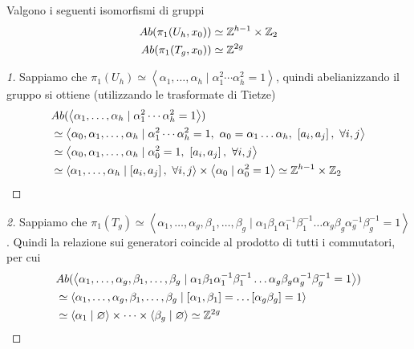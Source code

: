 \begin{lemma}
	\label{lemm:abel_torus_proj}
	Valgono i seguenti isomorfismi di gruppi
	\begin{equation}
	\begin{aligned}
	 Ab(\pi_1(U_h, x_0)) & \simeq \mathbb{Z}^{h-1} \times \mathbb{Z}_2 \\
	 Ab(\pi_1(T_g, x_0)) & \simeq \mathbb{Z}^{2g}
	\end{aligned}
	\end{equation}  
\end{lemma}
\begin{proof}[1]
	Sappiamo che $\pi_1(U_h) \simeq \left\langle \alpha_1, \dots, \alpha_h \mid \alpha^2_1 \cdots \alpha^2_h = 1\right\rangle$, quindi abelianizzando il gruppo si ottiene (utilizzando le trasformate di Tietze)
	\begin{equation}
	\begin{aligned}
		& Ab( \left\langle \alpha_1, \dots, \alpha_h \mid \alpha^2_1 \cdots \alpha^2_h = 1\right\rangle) \\
		& \simeq \left\langle \alpha_0, \alpha_1, \dots, \alpha_h \mid \alpha^2_1 \cdots \alpha^2_h = 1,\ \alpha_0 = \alpha_1 \dots \alpha_h,\ \left[a_i, a_j\right],\ \forall i,j \right\rangle\\
		& \simeq \left\langle \alpha_0, \alpha_1, \dots, \alpha_h \mid \alpha^2_0 = 1,\ \left[a_i, a_j\right],\ \forall i,j \right\rangle \\
		& \simeq \left\langle \alpha_1, \dots, \alpha_h \mid \left[a_i, a_j\right],\ \forall i,j \right\rangle \times \left\langle \alpha_0 \mid \alpha^2_0 = 1\right\rangle \simeq \mathbb{Z}^{h-1} \times \mathbb{Z}_2 
	\end{aligned}
	\end{equation}
\end{proof}
\begin{proof}[2]
	Sappiamo che $\pi_1(T_g) \simeq \left\langle \alpha_1, \dots, \alpha_g, \beta_1, \dots, \beta_g \mid \alpha_1 \beta_1\alpha^{-1}_1\beta^{-1}_1 \dots \alpha_g \beta_g\alpha^{-1}_g\beta^{-1}_g = 1\right\rangle$. Quindi la relazione sui generatori coincide al prodotto di tutti i commutatori, per cui 
	\begin{equation}
	\begin{aligned}
		& Ab(\left\langle \alpha_1, \dots, \alpha_g, \beta_1, \dots, \beta_g \mid \alpha_1 \beta_1\alpha^{-1}_1\beta^{-1}_1 \dots \alpha_g \beta_g\alpha^{-1}_g\beta^{-1}_g = 1\right\rangle) \\ & \simeq \left\langle \alpha_1, \dots, \alpha_g, \beta_1, \dots, \beta_g \mid \left[\alpha_1, \beta_1\right] = \dots \left[\alpha_g \beta_g\right] = 1\right\rangle\\
		& \simeq \left\langle \alpha_1 \mid \varnothing \right\rangle \times \dots \times \left\langle\beta_g \mid \varnothing \right\rangle \simeq \mathbb{Z}^{2g}
	\end{aligned}
	\end{equation}
\end{proof}

